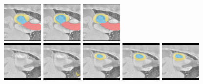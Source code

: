 \begin{figure}[h!]
    \includegraphics[width=0.18\textwidth]{image/chap04/seg/1_150pred.png}
    \includegraphics[width=0.18\textwidth]{image/chap04/seg/1_150upper.png}
    \includegraphics[width=0.18\textwidth]{image/chap04/seg/1_150gt.png}
    \\
    \includegraphics[width=0.18\textwidth]{image/chap04/seg/1_185input_ct.png}
    \includegraphics[width=0.18\textwidth]{image/chap04/seg/1_185lower.png}
    \includegraphics[width=0.18\textwidth]{image/chap04/seg/1_185pred.png}
    \includegraphics[width=0.18\textwidth]{image/chap04/seg/1_185upper.png}
    \includegraphics[width=0.18\textwidth]{image/chap04/seg/1_185gt.png}

\end{figure}
